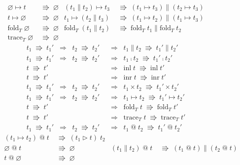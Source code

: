 \documentclass{jsarticle}
\newcommand{\reduct}[2]{#1 &\;\Rrightarrow\; #2}
\newcommand{\reduction}[2]{#1 \;\Rrightarrow\; #2}
\begin{document}
\begin{figure}[H]
\begin{align*}
    \reduct{\varnothing\mapsto{}t}{\varnothing} &
    \reduct{(t_1\parallel{}t_2)\mapsto{}t_3}{(t_1\mapsto{}t_3)\parallel(t_2\mapsto{}t_3)} \\
    \reduct{t\mapsto\varnothing}{\varnothing} &
    \reduct{t_1\mapsto(t_2\parallel{}t_3)}{(t_1\mapsto{}t_2)\parallel(t_1\mapsto{}t_3)} \\
    \reduct{\text{fold}_T\;\varnothing}{\varnothing} &
    \reduct{\text{fold}_T\;(t_1\parallel{}t_2)}{\text{fold}_T\;t_1\parallel\text{fold}_T\;t_2} \\
    \reduct{\text{trace}_T\;\varnothing}{\varnothing}
  \end{align*}
  \begin{align*}
    \reduction{t_1}{t_1'} \;\;\Longrightarrow\;\; \reduction{t_2}{t_2'} &\;\;\Longrightarrow\;\; \reduction{t_1\parallel{}t_2}{t_1'\parallel{}t_2'} \\
    \reduction{t_1}{t_1'} \;\;\Longrightarrow\;\; \reduction{t_2}{t_2'} &\;\;\Longrightarrow\;\; \reduction{t_1\fcmp{}t_2}{t_1'\fcmp{}t_2'} \\
    \reduction{t}{t'} &\;\;\Longrightarrow\;\; \reduction{\text{inl}\;t}{\text{inl}\;t'} \\
    \reduction{t}{t'} &\;\;\Longrightarrow\;\; \reduction{\text{inr}\;t}{\text{inr}\;t'} \\
    \reduction{t_1}{t_1'} \;\;\Longrightarrow\;\; \reduction{t_2}{t_2'} &\;\;\Longrightarrow\;\; \reduction{t_1\times{}t_2}{t_1'\times{}t_2'} \\
    \reduction{t_1}{t_1'} \;\;\Longrightarrow\;\; \reduction{t_2}{t_2'} &\;\;\Longrightarrow\;\; \reduction{t_1\mapsto{}t_2}{t_1'\mapsto{}t_2'} \\
    \reduction{t}{t'} &\;\;\Longrightarrow\;\; \reduction{\text{fold}_T\;t}{\text{fold}_T\;t'} \\
    \reduction{t}{t'} &\;\;\Longrightarrow\;\; \reduction{\text{trace}_T\;t}{\text{trace}_T\;t'} \\
    \reduction{t_1}{t_1'} \;\;\Longrightarrow\;\; \reduction{t_2}{t_2'} &\;\;\Longrightarrow\;\; \reduction{t_1\;\text{@}\;t_2}{t_1'\;\text{@}\;t_2'}
  \end{align*}
  \begin{align*}
    \reduct{(t_1\mapsto{}t_2)\;\text{@}\;t}{(t_1\triangleright{}t)\;t_2} \\
    \reduct{\varnothing\;\text{@}\;t}{\varnothing} &
    \reduct{(t_1\parallel{}t_2)\;\text{@}\;t}{(t_1\;\text{@}\;t)\parallel(t_2\;\text{@}\;t)} \\
    \reduct{t\;\text{@}\;\varnothing}{\varnothing} &

\end{align*}
\end{figure}
\end{document}
